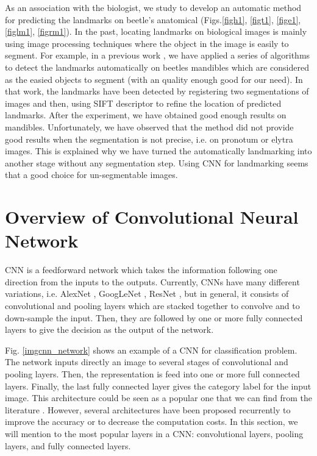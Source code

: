\documentclass[review]{elsarticle}
\begin{document}
As an association with the biologist, we study to develop an automatic method for predicting the landmarks on beetle's anatomical (Figs.\ref{figh1}, \ref{figt1}, \ref{fige1}, \ref{figlm1}, \ref{figrm1}). In the past, locating landmarks on biological images is mainly using image processing techniques where the object in the image is easily to segment. For example, in a previous work \cite{le2017maelab}, we have applied a series of algorithms to detect the landmarks automatically on beetles mandibles which are considered as the easied objects to segment (with an quality enough good for our need). In that work, the landmarks have been detected by registering two segmentations of images and then, using SIFT descriptor to refine the location of predicted landmarks. After the experiment, we have obtained good enough results on mandibles. Unfortunately, we have observed that the method did not provide good results when the segmentation is not precise, i.e. on pronotum or elytra images. This is explained why we have turned the automatically landmarking into another stage without any segmentation step. Using CNN for landmarking seems that a good choice for un-segmentable images.

\section{Overview of Convolutional Neural Network}
\label{sOverview}
CNN is a feedforward network which takes the information following one direction from the inputs to the outputs. Currently, CNNs have many different variations, i.e. AlexNet \cite{krizhevsky2012imagenet}, GoogLeNet \cite{szegedy2014going}, ResNet \cite{he2016deep}, but in general, it consists of convolutional and pooling layers which are stacked together to convolve and to down-sample the input. Then, they are followed by one or more fully connected layers to give the decision as the output of the network. 

Fig. \ref{imgcnn_network} shows an example of a CNN for classification problem. The network inputs directly an image to several stages of convolutional and pooling layers. Then, the representation is feed into one or more full connected layers. Finally, the last fully connected layer gives the category label for the input image. This architecture could be seen as a popular one that we can find from the literature \cite{lecun1998gradient, krizhevsky2012imagenet}. However, several architectures have been proposed recurrently to improve the accuracy or to decrease the computation costs. In this section, we will mention to the most popular layers in a CNN: convolutional layers, pooling layers, and fully connected layers.
\end{document}
